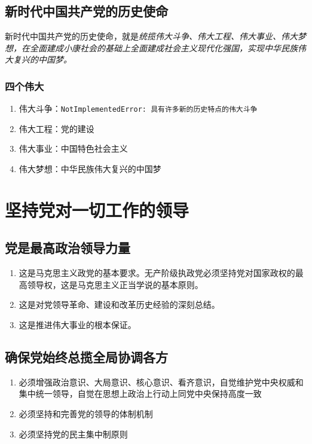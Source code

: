     \subsection{新时代中国共产党的历史使命}
        新时代中国共产党的历史使命，就是\emph{统揽伟大斗争、伟大工程、伟大事业、伟大梦想，在全面建成小康社会的基础上全面建成社会主义现代化强国，实现中华民族伟大复兴的中国梦。}

        \subsubsection{四个伟大}
        \begin{enumerate}
            \item 伟大斗争：\verb|NotImplementedError: 具有许多新的历史特点的伟大斗争|
            \item 伟大工程：党的建设
            \item 伟大事业：中国特色社会主义
            \item 伟大梦想：中华民族伟大复兴的中国梦
        \end{enumerate}



\section{坚持党对一切工作的领导}
    \subsection{党是最高政治领导力量}
        \begin{enumerate}
            \item 这是马克思主义政党的基本要求。无产阶级执政党必须坚持党对国家政权的最高领导权，这是马克思主义正当学说的基本原则。
            \item 这是对党领导革命、建设和改革历史经验的深刻总结。
            \item 这是推进伟大事业的根本保证。
        \end{enumerate}

    \subsection{确保党始终总揽全局协调各方}
        \begin{enumerate}
            \item 必须增强政治意识、大局意识、核心意识、看齐意识，自觉维护党中央权威和集中统一领导，自觉在思想上政治上行动上同党中央保持高度一致
            \item 必须坚持和完善党的领导的体制机制
            \item 必须坚持党的民主集中制原则
        \end{enumerate}

